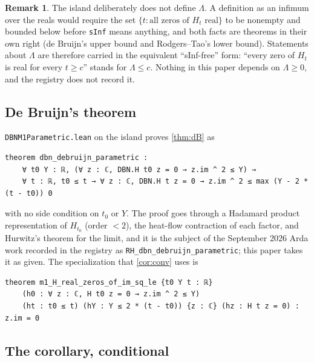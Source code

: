 \documentclass[11pt]{article}
\theoremstyle{definition}
\newtheorem{remark}[theorem]{Remark}
\newcommand{\lean}[1]{\texttt{#1}}
\newcommand{\Lam}{\Lambda}
\newcommand{\Hfun}{H}
\begin{document}
\begin{remark}\label{rem:sinf}
The island deliberately does not define $\Lam$. A definition as an infimum over the reals would require the set $\{t : \text{all zeros of } \Hfun_t \text{ real}\}$ to be nonempty and bounded below before \lean{sInf} means anything, and both facts are theorems in their own right (de Bruijn's upper bound and Rodgers--Tao's lower bound). Statements about $\Lam$ are therefore carried in the equivalent ``sInf-free'' form: ``every zero of $\Hfun_t$ is real for every $t \ge c$'' stands for $\Lam \le c$. Nothing in this paper depends on $\Lam \ge 0$, and the registry does not record it.
\end{remark}

\subsection{De Bruijn's theorem}

\lean{DBNM1Parametric.lean} on the island proves \cref{thm:dB} as
\begin{lstlisting}
theorem dbn_debruijn_parametric :
    ∀ t0 Y : ℝ, (∀ z : ℂ, DBN.H t0 z = 0 → z.im ^ 2 ≤ Y) →
    ∀ t : ℝ, t0 ≤ t → ∀ z : ℂ, DBN.H t z = 0 → z.im ^ 2 ≤ max (Y - 2 * (t - t0)) 0
\end{lstlisting}
with no side condition on $t_0$ or $Y$. The proof goes through a Hadamard product representation of $\Hfun_{t_0}$ (order $< 2$), the heat-flow contraction of each factor, and Hurwitz's theorem for the limit, and it is the subject of the September 2026 Arda work recorded in the registry as \lean{RH\_dbn\_debruijn\_parametric}; this paper takes it as given. The specialization that \cref{cor:conv} uses is
\begin{lstlisting}
theorem m1_H_real_zeros_of_im_sq_le {t0 Y t : ℝ}
    (h0 : ∀ z : ℂ, H t0 z = 0 → z.im ^ 2 ≤ Y)
    (ht : t0 ≤ t) (hY : Y ≤ 2 * (t - t0)) {z : ℂ} (hz : H t z = 0) : z.im = 0
\end{lstlisting}

\subsection{The corollary, conditional}
\end{document}

